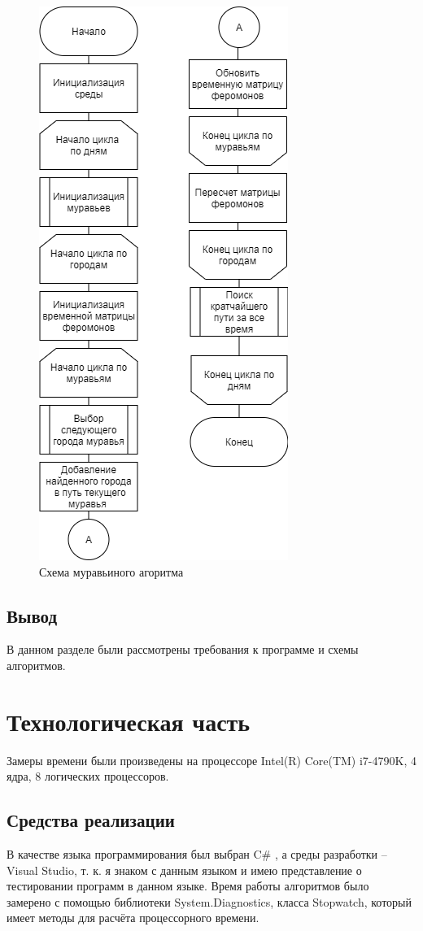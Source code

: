 \documentclass[12pt]{report}
\begin{document}
\begin{figure}[H]
        	\centering
        	\includegraphics[scale = 0.8]{Ant.png}
        	\caption{Схема муравьиного агоритма}
        	\label{fig:ant}
\end{figure}


\section*{Вывод}
В данном разделе были рассмотрены требования к программе и схемы алгоритмов.
 
\newpage
\chapter{Технологическая часть}
Замеры времени были произведены на процессоре Intel(R) Core(TM) i7-4790K, 4 ядра, 8 логических процессоров.

\section{Средства реализации}
В качестве языка программирования был выбран C\# \cite{Microsoft}, а среды разработки -- Visual Studio, т. к. я знаком с данным языком и имею представление о тестировании программ в данном языке. Время работы алгоритмов было замерено с помощью библиотеки System.Diagnostics, класса Stopwatch, который имеет методы для расчёта процессорного времени.
\end{document}
